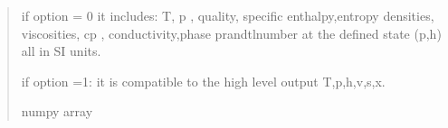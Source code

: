 \documentclass[letterpaper,10pt,english]{sphinxmanual}
\begin{document}
\begin{fulllineitems}
\begin{quote}
\begin{description}
\begin{itemize}
\end{itemize}

\sphinxAtStartPar

\sphinxAtStartPar
{} \textendash{} if option = 0 it includes: T, p , quality, specific enthalpy,entropy
densities,
viscosities, cp , conductivity,phase prandtl\sphinxhyphen{}number
at the defined state (p,h)
all in SI units.

\sphinxAtStartPar
if option =1: it is compatible to the high level output
T,p,h,v,s,x.


\sphinxAtStartPar
numpy array

\end{description}\end{quote}

\end{fulllineitems}

\end{document}
